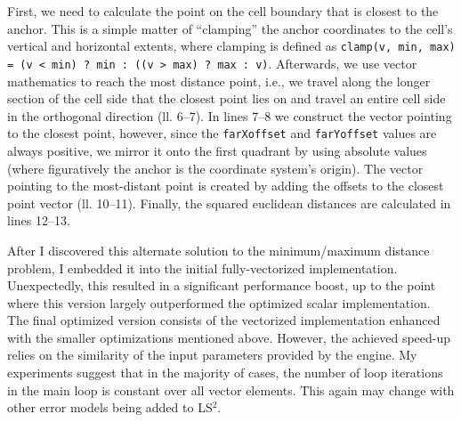 First, we need to calculate the point on the cell boundary that is closest to the anchor. This is a simple matter of ``clamping'' the anchor coordinates to the cell's vertical and horizontal extents, where clamping is defined as \texttt{clamp(v, min, max) = (v < min) ? min : ((v > max) ? max : v)}. Afterwards, we use vector mathematics to reach the most distance point, i.e., we travel along the longer section of the cell side that the closest point lies on and travel an entire cell side in the orthogonal direction (ll. 6--7). In lines 7--8 we construct the vector pointing to the closest point, however, since the \texttt{farXoffset} and \texttt{farYoffset} values are always positive, we mirror it onto the first quadrant by using absolute values (where figuratively the anchor is the coordinate system's origin). The vector pointing to the most-distant point is created by adding the offsets to the closest point vector (ll. 10--11). Finally, the squared euclidean distances are calculated in lines 12--13.

After I discovered this alternate solution to the minimum/maximum distance problem, I embedded it into the initial fully-vectorized implementation. Unexpectedly, this resulted in a significant performance boost, up to the point where this version largely outperformed the optimized scalar implementation. The final optimized version consists of the vectorized implementation enhanced with the smaller optimizations mentioned above. However, the achieved speed-up relies on the similarity of the input parameters provided by the engine. My experiments suggest that in the majority of cases, the number of loop iterations in the main loop is constant over all vector elements. This again may change with other error models being added to LS$^{2}$.

